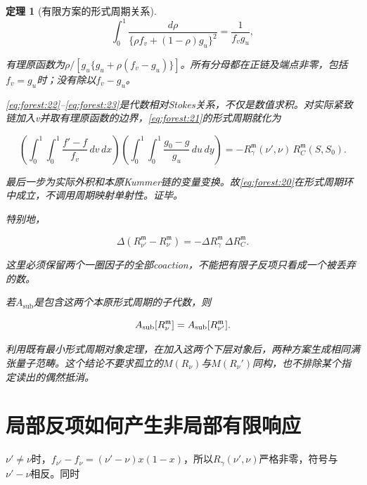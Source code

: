 \documentclass[11pt,a4paper,oneside]{ctexrep}
\theoremstyle{cnplain}
\newtheorem{theorem}{定理}[chapter]
\theoremstyle{definition}
\theoremstyle{remark}
\begin{document}
\begin{theorem}[有限方案的形式周期关系]
\begin{equation}
\int_0^1\frac{d\rho}{\{\rho f_v+(1-\rho)g_u\}^2}
       =\frac1{f_vg_u},                                       \label{eq:forest:23}
\end{equation}

有理原函数为\(\rho /[g_u\{g_u+\rho (f_v- g_u)\}]\)。所有分母都在正链及端点非零，包括\(f_v=g_u\)时；没有除以\(f_v- g_u\)。

\eqref{eq:forest:22}--\eqref{eq:forest:23}是代数相对Stokes关系，不仅是数值求积。对实际紧致链加入v并取有理原函数的边界，\eqref{eq:forest:21}的形式周期就化为

\begin{equation}
\left(\int_0^1\!\!\int_0^1\frac{f'-f}{f_v}\,dv\,dx\right)
 \left(\int_0^1\!\!\int_0^1\frac{g_0-g}{g_u}\,du\,dy\right)
       =-R_\gamma^{\mathfrak m}(\nu',\nu)\,
                         R_C^{\mathfrak m}(S,S_0).
\end{equation}

最后一步为实际外积和本原Kummer链的变量变换。故\eqref{eq:forest:20}在形式周期环中成立，不调用周期映射单射性。证毕。

特别地，

\begin{equation}
\Delta(R_{\nu'}^{\mathfrak m}-R_\nu^{\mathfrak m})
       =-\Delta R_\gamma^{\mathfrak m}\,\Delta R_C^{\mathfrak m}.            \label{eq:forest:24}
\end{equation}

这里必须保留两个一圈因子的全部coaction，不能把有限子反项只看成一个被丢弃的数。

若\(A_{\mathrm{sub}}\)是包含这两个本原形式周期的子代数，则

\begin{equation}
A_{\rm sub}[R_\nu^{\mathfrak m}]
        =A_{\rm sub}[R_{\nu'}^{\mathfrak m}].                   \label{eq:forest:25}
\end{equation}

利用既有最小形式周期对象定理，在加入这两个下层对象后，两种方案生成相同满张量子范畴。这个结论不要求孤立的\(M(R_\nu )\)与\(M(R_\nu ')\)同构，也不排除某个指定读出的偶然抵消。

\end{theorem}

\section{局部反项如何产生非局部有限响应}\label{sec:forest:7}

\(\nu '\ne \nu \)时，\(f_{\nu '}- f_\nu =(\nu '- \nu )x(1- x)\)，所以\(R_\gamma (\nu ',\nu )\)严格非零，符号与\(\nu '- \nu \)相反。同时
\end{document}
